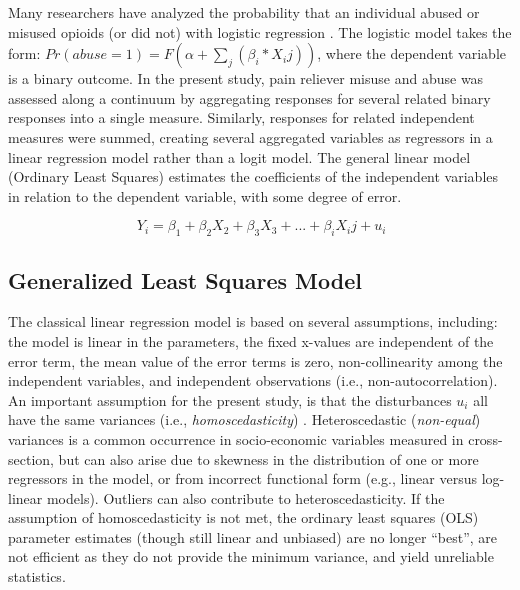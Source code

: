 \documentclass[sigconf]{acmart}
\begin{document}

Many researchers have analyzed the probability that an individual abused 
or misused opioids (or did not) with logistic regression 
\cite{rice12, unick13, jones15, mccabe12}. The logistic model takes the form:
$ Pr(abuse=1) = F(\alpha+\sum_j(\beta_i*X_ij)) $, where the dependent variable
is a binary outcome. In the present study, pain reliever misuse and abuse was 
assessed along a continuum by aggregating responses for several related binary 
responses into a single measure. Similarly, responses for related independent 
measures were summed, creating several aggregated variables as regressors in a 
linear regression model rather than a logit model. The general linear model 
(Ordinary Least Squares) estimates the coefficients of the independent 
variables in relation to the dependent variable, with some degree of error. 

\begin{equation}
  \ Y_i = \beta_1 + \beta_2X_2 +\beta_3X_3 +... + \beta_iX_ij + u_i
\end{equation}


\subsection{Generalized Least Squares Model}

The classical linear regression model is based on several assumptions, 
including: the model is linear in the parameters, the fixed x-values are 
independent of the error term, the mean value of the error terms is zero, 
non-collinearity among the independent variables, and independent 
observations (i.e., non-autocorrelation). An important assumption for the 
present study, is that the disturbances $u_i$ all have the same variances 
(i.e., \emph{homoscedasticity}) . Heteroscedastic 
(\emph{non-equal}) variances is a common occurrence in socio-economic 
variables measured in cross-section, but can also arise due to skewness in 
the distribution of one or more regressors in the model, or from incorrect 
functional form (e.g., linear versus log-linear models). Outliers can also 
contribute to heteroscedasticity. If the assumption of homoscedasticity is 
not met, the ordinary least squares (OLS) parameter estimates (though still 
linear and unbiased) are no longer ``best'', are not efficient as they do 
not provide the minimum variance, and yield unreliable statistics. 
\end{document}
